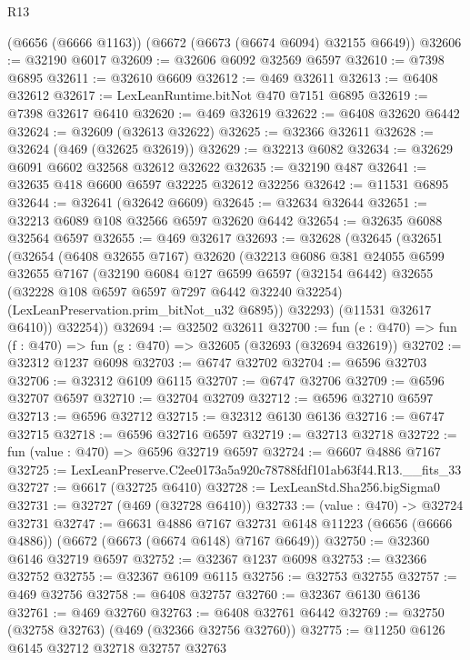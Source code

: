\begin{lexlean}{R13}
\begin{coremodule}
    (@6656 (@6666 @1163))
    (@6672 (@6673 (@6674 @6094) @32155 @6649))
@32606 := @32190 @6017
@32609 := @32606 @6092 @32569 @6597
@32610 := @7398 @6895
@32611 := @32610 @6609
@32612 := @469 @32611
@32613 := @6408 @32612
@32617 := LexLeanRuntime.bitNot @470 @7151 @6895
@32619 := @7398 @32617 @6410
@32620 := @469 @32619
@32622 := @6408 @32620 @6442
@32624 := @32609 (@32613 @32622)
@32625 := @32366 @32611
@32628 := @32624 (@469 (@32625 @32619))
@32629 := @32213 @6082
@32634 := @32629 @6091 @6602 @32568 @32612 @32622
@32635 := @32190 @487
@32641 := @32635 @418 @6600 @6597 @32225 @32612 @32256
@32642 := @11531 @6895
@32644 := @32641 (@32642 @6609)
@32645 := @32634 @32644
@32651 := @32213 @6089 @108 @32566 @6597 @32620 @6442
@32654 := @32635 @6088 @32564 @6597
@32655 := @469 @32617
@32693 := @32628
    (@32645
      (@32651
        (@32654
          (@6408 @32655 @7167)
          @32620
          (@32213
            @6086
            @381
            @24055
            @6599
            @32655
            @7167
            (@32190
              @6084
              @127
              @6599
              @6597
              (@32154 @6442)
              @32655
              (@32228 @108 @6597 @6597 @7297 @6442 @32240 @32254)
              (LexLeanPreservation.prim_bitNot_u32 @6895))
            @32293)
          (@11531 @32617 @6410))
        @32254))
@32694 := @32502 @32611
@32700 := fun (e : @470) => fun (f : @470) => fun (g : @470) => @32605 (@32693 (@32694 @32619))
@32702 := @32312 @1237 @6098
@32703 := @6747 @32702
@32704 := @6596 @32703
@32706 := @32312 @6109 @6115
@32707 := @6747 @32706
@32709 := @6596 @32707 @6597
@32710 := @32704 @32709
@32712 := @6596 @32710 @6597
@32713 := @6596 @32712
@32715 := @32312 @6130 @6136
@32716 := @6747 @32715
@32718 := @6596 @32716 @6597
@32719 := @32713 @32718
@32722 := fun (value : @470) => @6596 @32719 @6597
@32724 := @6607 @4886 @7167
@32725 := LexLeanPreserve.C2ee0173a5a920c78788fdf101ab63f44.R13.__fits_33
@32727 := @6617 (@32725 @6410)
@32728 := LexLeanStd.Sha256.bigSigma0
@32731 := @32727 (@469 (@32728 @6410))
@32733 := (value : @470) -> @32724 @32731
@32747 := @6631
    @4886
    @7167
    @32731
    @6148
    @11223
    (@6656 (@6666 @4886))
    (@6672 (@6673 (@6674 @6148) @7167 @6649))
@32750 := @32360 @6146 @32719 @6597
@32752 := @32367 @1237 @6098
@32753 := @32366 @32752
@32755 := @32367 @6109 @6115
@32756 := @32753 @32755
@32757 := @469 @32756
@32758 := @6408 @32757
@32760 := @32367 @6130 @6136
@32761 := @469 @32760
@32763 := @6408 @32761 @6442
@32769 := @32750 (@32758 @32763) (@469 (@32366 @32756 @32760))
@32775 := @11250 @6126 @6145 @32712 @32718 @32757 @32763

\end{coremodule}
\end{lexlean}

